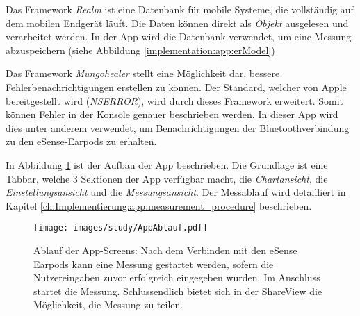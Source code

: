 Das Framework \textit{Realm} ist eine Datenbank für mobile Systeme, die vollständig auf dem mobilen Endgerät läuft.
Die Daten können direkt als \textit{Objekt} ausgelesen und verarbeitet werden.
In der App wird die Datenbank verwendet, um eine Messung abzuspeichern (siehe Abbildung \ref{implementation:app:erModel})

Das Framework \textit{Mungohealer} stellt eine Möglichkeit dar, bessere Fehlerbenachrichtigungen erstellen zu können. 
Der Standard, welcher von Apple bereitgestellt wird (\textit{NSERROR}), wird durch dieses Framework erweitert.
Somit können Fehler in der Konsole genauer beschrieben werden. 
In dieser App wird dies unter anderem verwendet, um Benachrichtigungen der Bluetoothverbindung zu den eSense-Earpods zu erhalten.

In Abbildung \ref{systemdesign:appflow} ist der Aufbau der App beschrieben. 
Die Grundlage ist eine Tabbar, welche 3 Sektionen der App verfügbar macht, die \textit{Chartansicht}, die \textit{Einstellungsansicht} und die \textit{Messungsansicht}.
Der Messablauf wird detailliert in Kapitel \ref{ch:Implementierung:app:measurement_procedure} beschrieben.

\begin{figure}[h]
    \centering
    \texttt{[image: images/study/AppAblauf.pdf]}
  \caption{Ablauf der App-Screens: Nach dem Verbinden mit den eSense Earpods kann eine Messung gestartet werden, sofern die Nutzereingaben zuvor erfolgreich eingegeben wurden. Im Anschluss startet die Messung. Schlussendlich bietet sich in der ShareView die Möglichkeit, die Messung zu teilen.}
  \label{systemdesign:appflow}
 \end{figure}
